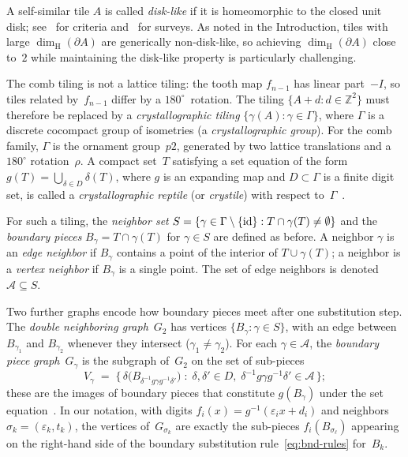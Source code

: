 \documentclass{amsart}
\theoremstyle{definition}
\theoremstyle{remark}
\newcommand{\Z}{\mathbb{Z}}
\newcommand{\dH}{\dim_{\mathrm{H}}}
\begin{document}
A self-similar tile $A$ is called \emph{disk-like} if it is homeomorphic to the
closed unit disk; see~\cite{bandt-wang,leung-lau} for criteria
and~\cite{akiyama-thuswaldner,ngai-tang} for surveys.  As noted in the Introduction, tiles with large
$\dH(\partial A)$ are generically non-disk-like, so achieving
$\dH(\partial A)$ close to~$2$ while maintaining the disk-like property
is particularly challenging.

The comb tiling is not a lattice tiling: the tooth map $f_{n-1}$ has
linear part~$-I$, so tiles related by~$f_{n-1}$ differ by a
$180^\circ$~rotation.  The tiling $\{A + d : d \in \Z^2\}$ must
therefore be replaced by a \emph{crystallographic tiling}
$\{\gamma(A) : \gamma \in \Gamma\}$, where $\Gamma$ is a discrete
cocompact group of isometries (a \emph{crystallographic group}).
For the comb family, $\Gamma$ is the ornament group~$p2$, generated by
two lattice translations and a $180^\circ$ rotation~$\rho$.
A compact set~$T$ satisfying a set equation of the form
$g(T) = \bigcup_{\delta \in D} \delta(T)$, where $g$ is an expanding
map and $D \subset \Gamma$ is a finite digit set, is called a
\emph{crystallographic reptile} (or \emph{crystile}) with respect
to~$\Gamma$~\cite[Definition~1]{loridant-luo-thuswaldner}.

For such a tiling, the \emph{neighbor set}
$S = \{\gamma \in \Gamma \setminus \{{\rm id}\} : T \cap \gamma(T)
\ne \emptyset\}$
and the \emph{boundary pieces}
$B_\gamma = T \cap \gamma(T)$ for $\gamma \in S$
are defined as before.  A neighbor $\gamma$ is an
\emph{edge neighbor} if $B_\gamma$ contains a point of the interior
of $T \cup \gamma(T)$; a neighbor is a \emph{vertex neighbor} if
$B_\gamma$ is a single point.  The set of edge neighbors is denoted
$\mathcal{A} \subseteq S$.

Two further graphs encode how boundary pieces meet after one
substitution step.  The \emph{double neighboring graph}~$G_2$ has
vertices $\{B_\gamma : \gamma \in S\}$, with an edge between
$B_{\gamma_1}$ and $B_{\gamma_2}$ whenever they intersect
($\gamma_1 \ne \gamma_2$).
For each $\gamma \in \mathcal{A}$, the \emph{boundary piece
graph}~$G_\gamma$ is the subgraph of~$G_2$ on the set of sub-pieces
\[
  V_\gamma \;=\;
  \bigl\{\, \delta\bigl(B_{\delta^{-1} g\gamma g^{-1}\delta'}\bigr)
  \;:\; \delta, \delta' \in D,\;
  \delta^{-1} g\gamma g^{-1}\delta' \in \mathcal{A} \,\bigr\};
\]
these are the images of boundary pieces that constitute
$g(B_\gamma)$ under the set
equation~\cite[Definition~4]{loridant-luo-thuswaldner}.
In our notation, with digits $f_i(x) = g^{-1}(\varepsilon_i x + d_i)$
and neighbors $\sigma_k = (\varepsilon_k, t_k)$, the vertices
of~$G_{\sigma_k}$ are exactly the sub-pieces $f_i(B_{\sigma_\ell})$
appearing on the right-hand side of the boundary substitution
rule~\eqref{eq:bnd-rules} for~$B_k$.
\end{document}

